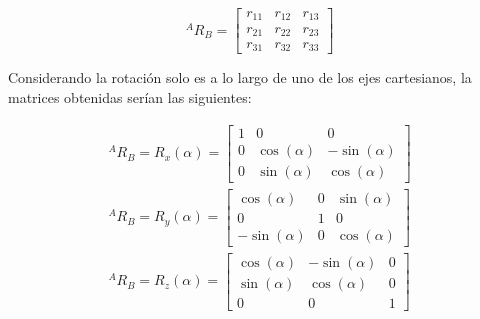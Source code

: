\begin{equation}
    ^{A}R_{B} = \left[ \begin{array}{ccc}
        r_{11} & r_{12} & r_{13}  \\
        r_{21} & r_{22} & r_{23}  \\
        r_{31} & r_{32} & r_{33}
    \end{array} \right]
\end{equation}

Considerando la rotación solo es a lo largo de uno de los ejes cartesianos, la matrices obtenidas serían las siguientes:

\begin{subequations}
    \begin{eqnarray}
        ^{A}R_{B} = R_x \left( \alpha \right) = \left[ \begin{array}{ccc} 1 & 0 & 0  \\ 0 & \cos\left(\alpha\right)  & -\sin\left(\alpha\right)  \\ 0 & \sin\left(\alpha\right) & \cos\left(\alpha\right) \end{array} \right] \\
        ^{A}R_{B} = R_y \left( \alpha \right) = \left[ \begin{array}{ccc} \cos\left(\alpha\right) & 0 & \sin\left(\alpha\right)  \\ 0 & 1 & 0  \\ -\sin\left(\alpha\right) & 0 & \cos\left(\alpha\right) \end{array} \right] \\
        ^{A}R_{B} = R_z \left( \alpha \right) = \left[ \begin{array}{ccc} \cos\left(\alpha\right) & -\sin\left(\alpha\right) & 0  \\ \sin\left(\alpha\right) & \cos\left(\alpha\right) & 0  \\ 0 & 0 & 1 \end{array} \right]
    \end{eqnarray}
\end{subequations}

